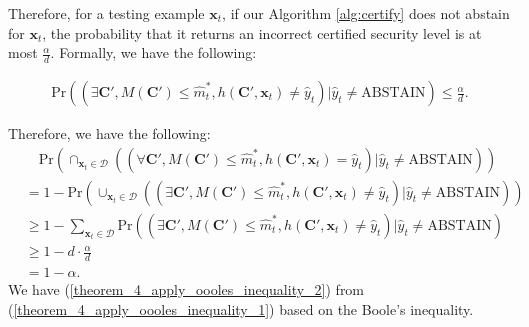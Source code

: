 \documentclass[letterpaper]{article} %
\begin{document}
Therefore, for a testing example $\mathbf{x}_t$, if our Algorithm \ref{alg:certify} does not abstain for $\mathbf{x}_t$, the probability that it returns an incorrect certified security level is at most $\frac{\alpha}{d}$. Formally, we have the following:  

\begin{align}
    \text{Pr}((\exists \mathbf{C}', M(\mathbf{C}')\leq \hat{m}_t^*, h(\mathbf{C}',\mathbf{x}_t)\neq\hat{y}_t)|\hat{y}_t \neq \text{ABSTAIN} ) \leq \frac{\alpha}{d}. 
\end{align}

Therefore, we have the following: 
\begin{align}
&\quad\text{Pr}(\cap_{\mathbf{x}_t \in \mathcal{D}} ((\forall \mathbf{C}',M(\mathbf{C}')\leq \hat{m}_t^*, h(\mathbf{C}', \mathbf{x}_t)=\hat{y}_t)|\hat{y}_t\neq \text{ABSTAIN})) \\
\label{theorem_4_apply_oooles_inequality_1}
&= 1 - \text{Pr}(\cup_{\mathbf{x}_t \in \mathcal{D}} ((\exists \mathbf{C}', M(\mathbf{C}')\leq \hat{m}_t^*, h(\mathbf{C}',\mathbf{x}_t)\neq\hat{y}_t )|\hat{y}_t\neq \text{ABSTAIN})) \\
\label{theorem_4_apply_oooles_inequality_2}
& \geq  1 - \sum_{\mathbf{x}_t \in \mathcal{D}}\text{Pr}((\exists \mathbf{C}', M(\mathbf{C}')\leq \hat{m}_t^*, h(\mathbf{C}',\mathbf{x}_t)\neq\hat{y}_t )|\hat{y}_t\neq \text{ABSTAIN}) \\
& \geq  1- d \cdot \frac{\alpha}{d} \\
& = 1 -\alpha .
\end{align}
We have (\ref{theorem_4_apply_oooles_inequality_2}) from (\ref{theorem_4_apply_oooles_inequality_1}) based on the Boole's inequality. 
\end{document}
